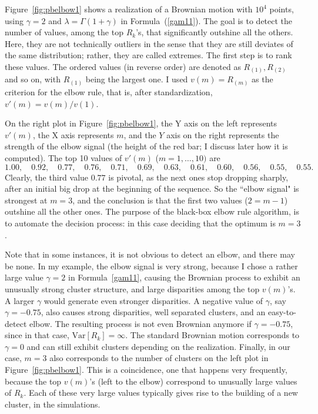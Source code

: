 \documentclass[10pt]{article}
\begin{document}

\noindent Figure~\ref{fig:pbelbow1} shows a realization of a Brownian motion with $10^4$ points, using $\gamma=2$ and
$\lambda=\Gamma(1+\gamma)$ in Formula~(\ref{gam11}).  The goal is to detect the number of values, among the top $R_k$'s, that significantly outshine all the others. Here, they are not technically outliers in the sense that they are still deviates of the same distribution; rather, they are called extremes. 
The first step is to rank these values. The ordered values (in reverse order) are denoted as $R_{(1)},R_{(2)}$ and so on, with $R_{(1)}$ being the largest one. I
used $v(m)=R_{(m)}$ as the criterion for the elbow rule, that is, after standardization, $v'(m)=v(m)/v(1)$. 

On the right plot in Figure~\ref{fig:pbelbow1}, the Y axis on the left represents $v'(m)$, the X axis represents $m$, and the $Y$ axis on the right represents the strength of the elbow signal (the height of the red bar; I discuss later how it is computed). The top 10 values of $v'(m)$ ($m=1,\dots, 10)$ are
$$1.00, \quad
0.92, \quad
0.77,\quad
0.76,\quad
0.71,\quad
0.69,\quad
0.63,\quad
0.61,\quad
0.60,\quad
0.56, \quad
0.55,\quad
0.55.$$
Clearly, the third value $0.77$ is pivotal, as the next ones stop dropping sharply, after an initial big drop at the beginning of the sequence. So the ``elbow signal" is strongest at $m=3$, and the conclusion is that the first two values ($2=m-1$) outshine all the other ones. The purpose of the black-box elbow rule algorithm, is to automate the decision process: in this case deciding that the optimum is $m=3$. 

Note that in some instances, it is not obvious to detect an elbow, and there may be none. In my example, the elbow signal is very strong, because I chose a rather large value $\gamma=2$ in Formula~\ref{gam11}, causing the Brownian process to exhibit an unusually strong cluster structure, and large disparities among the top $v(m)$'s.
A larger $\gamma$ would generate even stronger disparities. A negative value of $\gamma$, say $\gamma=-0.75$, also causes strong disparities, well separated clusters, and an easy-to-detect elbow. The resulting process is not even Brownian anymore if $\gamma=-0.75$, since in that case, $\mbox{Var}[R_k]=\infty$. The
standard  Brownian motion corresponds to $\gamma=0$ and can still exhibit clusters depending on the realization. Finally, in our case, $m=3$ also corresponds to the number of clusters on the left plot in Figure~\ref{fig:pbelbow1}. This is a coincidence, one that happens very frequently, because the top $v(m)$'s (left to the elbow) correspond to unusually large values of $R_k$. Each of these very large values typically gives
 rise to the building of a new cluster, in the simulations. 
\end{document}
